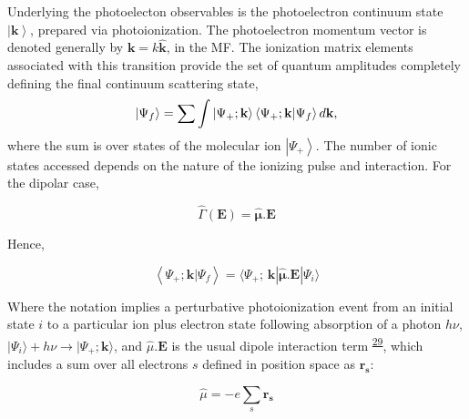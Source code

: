 \documentclass[10pt]{article}
\begin{document}
Underlying the photoelecton observables is the photoelectron continuum state $\left|\mathbf{k}\right>$, prepared via photoionization.
The photoelectron momentum vector is denoted generally by $\boldsymbol{\mathbf{k}}=k\mathbf{\hat{k}}$, in the MF. %
The ionization matrix elements associated with this transition %
provide the set of quantum amplitudes completely defining the final continuum scattering state,
\begin{equation}
\left|\Psi_f\right> = \sum{\int{\left|\Psi_{+};\bf{k}\right>\left<\Psi_{+};\mathbf{k}|\Psi_f\right> d\bf{k}}},
\label{eq:cstate}
\end{equation}
where the sum is over states of the molecular ion $\left|\Psi_{+}\right>$. The number of ionic states accessed depends on the nature of the ionizing pulse and interaction. For the dipolar case,

\begin{equation}
\hat{\Gamma}(\boldsymbol{\mathbf{E}}) = \hat{\mathbf{\mu}}.\boldsymbol{\mathbf{E}}
\end{equation}

Hence,

\begin{equation}
\left<\Psi_{+};\mathbf{k}|\Psi_f\right> =\langle\Psi_{+};\,\mathbf{k}|\hat{\mathbf{\mu}}.\boldsymbol{\mathbf{E}}|\Psi_{i}\rangle
\label{eq:matE-dipole}
\end{equation}

Where the notation implies a perturbative photoionization event from an initial state $i$ to a particular ion plus electron state following absorption of a photon $h\nu$, %
$|\Psi_{i}\rangle+h\nu{\rightarrow}|\Psi_{+};\boldsymbol{\mathbf{k}}\rangle$, and $\hat{\mu}.\boldsymbol{\mathbf{E}}$ is the usual dipole interaction term \textsuperscript{\hyperref[csl:29]{29}}, which includes a sum over all electrons $s$ defined in position space as $\mathbf{r_{s}}$:  

\begin{equation}
\hat{\mu}=-e\sum_{s}\mathbf{r_{s}}
\label{eq:dipole-operator}
\end{equation}
\end{document}
